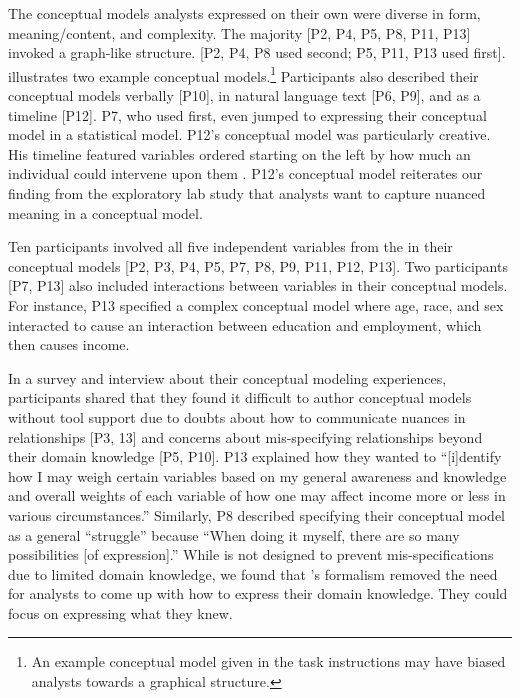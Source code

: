 The conceptual models analysts expressed on their own were diverse in form,
meaning/content, and complexity. The majority [P2, P4, P5, P8, P11, P13] invoked
a graph-like structure. [P2, P4, P8 used \rTisane second; P5, P11, P13 used
\rTisane first].  illustrates two example conceptual
models.\footnote{An example conceptual model given in the task instructions may
have biased analysts towards a graphical structure.} Participants also described
their conceptual models verbally [P10], in natural language text [P6, P9], and
as a timeline [P12]. P7, who used \rTisane first, even jumped to expressing
their conceptual model in a statistical model. P12's conceptual model was
particularly creative. His timeline featured variables ordered starting on the
left by how much an individual could intervene upon them . P12's conceptual model reiterates our finding from the exploratory lab
study that analysts want to capture nuanced meaning in a conceptual model. 

Ten participants involved all five independent variables from the \dataSet in
their conceptual models [P2, P3, P4, P5, P7, P8, P9, P11, P12, P13]. Two
participants [P7, P13] also included interactions between variables in their
conceptual models. For instance, P13 specified a complex conceptual model
 where age, race, and sex interacted to cause an
interaction between education and employment, which then causes income.

In a survey and interview about their conceptual modeling experiences,
participants shared that they found it difficult to author conceptual models
without tool support due to doubts about how to communicate nuances in
relationships [P3, 13] and concerns about mis-specifying relationships beyond
their domain knowledge [P5, P10]. P13 explained how they wanted to ``[i]dentify
how I may weigh certain variables based on my general awareness and knowledge
and overall weights of each variable of how one may affect income more or less
in various circumstances.'' Similarly, P8 described specifying their conceptual
model as a general ``struggle'' because ``When doing it myself, there are so
many possibilities [of expression].'' While \rTisane is not designed to prevent
mis-specifications due to limited domain knowledge, we found that \rTisane's
formalism removed the need for analysts to come up with how to express their
domain knowledge. They could focus on expressing what they knew. 

